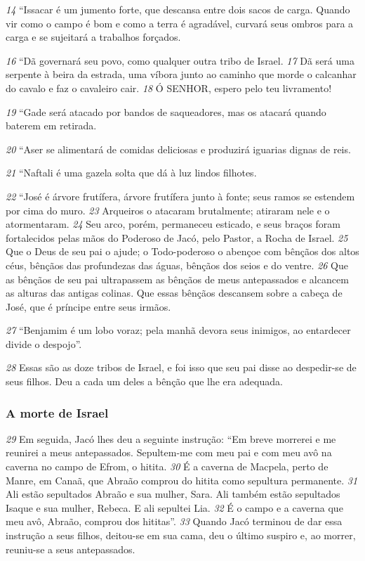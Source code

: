 \bigskip
\textit{\tiny 14}
“Issacar é um jumento forte,
  que descansa entre dois sacos de carga.
Quando vir como o campo é bom
  e como a terra é agradável,
curvará seus ombros para a carga
  e se sujeitará a trabalhos forçados.

\bigskip
\textit{\tiny 16}
“Dã governará seu povo,
  como qualquer outra tribo de Israel.
\textit{\tiny 17}
Dã será uma serpente à beira da estrada,
  uma víbora junto ao caminho
que morde o calcanhar do cavalo
  e faz o cavaleiro cair.
\textit{\tiny 18}
Ó SENHOR, espero pelo teu livramento!

\bigskip
\textit{\tiny 19}
“Gade será atacado por bandos de saqueadores,
  mas os atacará quando baterem em retirada.

\bigskip
\textit{\tiny 20}
“Aser se alimentará de comidas deliciosas
  e produzirá iguarias dignas de reis.

\bigskip
\textit{\tiny 21}
“Naftali é uma gazela solta
  que dá à luz lindos filhotes.

\bigskip
\textit{\tiny 22}
“José é árvore frutífera,
  árvore frutífera junto à fonte;
  seus ramos se estendem por cima do muro.
\textit{\tiny 23}
Arqueiros o atacaram brutalmente;
  atiraram nele e o atormentaram.
\textit{\tiny 24}
Seu arco, porém, permaneceu esticado,
  e seus braços foram fortalecidos
pelas mãos do Poderoso de Jacó,
  pelo Pastor, a Rocha de Israel.
\textit{\tiny 25}
Que o Deus de seu pai o ajude;
  o Todo-poderoso o abençoe
com bênçãos dos altos céus,
  bênçãos das profundezas das águas,
  bênçãos dos seios e do ventre.
\textit{\tiny 26}
Que as bênçãos de seu pai ultrapassem
  as bênçãos de meus antepassados
  e alcancem as alturas das antigas colinas.
Que essas bênçãos descansem sobre a cabeça de José,
       que é príncipe entre seus irmãos.
    
\bigskip
\textit{\tiny 27}
“Benjamim é um lobo voraz;
       pela manhã devora seus inimigos,
       ao entardecer divide o despojo”.
    
\bigskip
\textit{\tiny 28}
Essas são as doze tribos de Israel, e foi isso que seu pai disse ao despedir-se
de seus filhos. Deu a cada um deles a bênção que lhe era adequada.


\bigskip
\subsubsection*{A morte de Israel}
\textit{\tiny 29}
Em seguida, Jacó lhes deu a seguinte instrução: “Em breve morrerei e me
reunirei a meus antepassados. Sepultem-me com meu pai e com meu avô na
caverna no campo de Efrom, o hitita. 
\textit{\tiny 30}
É a caverna de Macpela, perto de Manre,
em Canaã, que Abraão comprou do hitita como sepultura permanente. 
\textit{\tiny 31}
Ali estão
sepultados Abraão e sua mulher, Sara. Ali também estão sepultados Isaque e sua
mulher, Rebeca. E ali sepultei Lia. 
\textit{\tiny 32}
É o campo e a caverna que meu avô, Abraão,
comprou dos hititas”.
\textit{\tiny 33}
Quando Jacó terminou de dar essa instrução a seus filhos, deitou-se em sua
cama, deu o último suspiro e, ao morrer, reuniu-se a seus antepassados.

